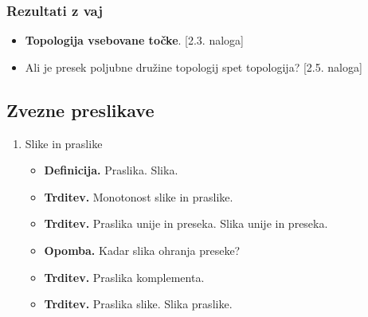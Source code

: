 \subsubsection*{Rezultati z vaj}
\begin{itemize}
    \item \textbf{Topologija vsebovane točke}. [2.3. naloga] 
    \item Ali je presek poljubne družine topologij spet topologija? [2.5. naloga]
\end{itemize}

\subsection{Zvezne preslikave}
\begin{enumerate}
    \item Slike in praslike
    \begin{itemize}
        \item \textbf{Definicija.} Praslika. Slika.
        \item \textbf{Trditev.} Monotonost slike in praslike.
        \item \textbf{Trditev.} Praslika unije in preseka. Slika unije in preseka.
        \item \textbf{Opomba.} Kadar slika ohranja preseke?
        \item \textbf{Trditev.} Praslika komplementa.
        \item \textbf{Trditev.} Praslika slike. Slika praslike.
    \end{itemize}


\end{enumerate}
